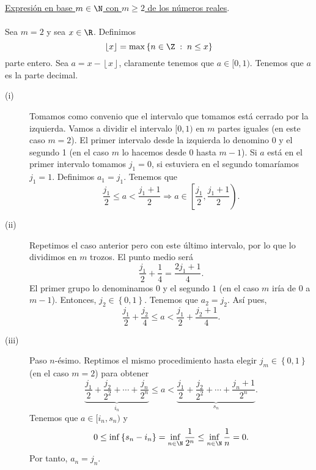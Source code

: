 \underline{Expresión en base $\displaystyle m \in \N $ con $\displaystyle m \geq 2 $ de los números reales}. \\ \\
\normalfont Sea $\displaystyle m = 2 $ y sea $\displaystyle x \in \R $. Definimos 
\[\left\lfloor x \right\rfloor = \max \left\{ n \in \Z \; : \; n\leq x\right\}  \]
parte entero. Sea $\displaystyle a = x - \left\lfloor x \right\rfloor $, claramente tenemos que $\displaystyle a \in [0,1) $. Tenemos que $\displaystyle a $ es la parte decimal.  
\begin{description}
\item[(i)] Tomamos como convenio que el intervalo que tomamos está cerrado por la izquierda. Vamos a dividir el intervalo $\displaystyle [0,1) $ en $\displaystyle m $ partes iguales (en este caso $\displaystyle m = 2 $). El primer intervalo desde la izquierda lo denomino 0 y el segundo 1 (en el caso $\displaystyle m $ lo hacemos desde 0 hasta $\displaystyle m -1 $). Si $\displaystyle a $ está en el primer intervalo tomamos $\displaystyle j_{1} = 0 $, si estuviera en el segundo tomaríamos $\displaystyle j_{1} = 1 $. Definimos $\displaystyle a_{1} = j_{1} $. Tenemos que 
	\[\frac{j_{1}}{2}\leq a < \frac{j_{1}+1}{2} \Rightarrow a \in \left[\frac{j_{1}}{2}, \frac{j_{1}+1}{2}\right).\]
\item[(ii)] Repetimos el caso anterior pero con este último intervalo, por lo que lo dividimos en $\displaystyle m $ trozos. El punto medio será
	\[\frac{j_{1}}{2} + \frac{1}{4} = \frac{2j_{1}+1}{4} .\]
	El primer grupo lo denominamos $\displaystyle 0 $ y el segundo $\displaystyle 1 $ (en el caso $\displaystyle m $ iría de $\displaystyle 0 $ a $\displaystyle m -1 $). Entonces, $\displaystyle j_{2}\in \left\{ 0,1\right\}  $. Tenemos que $\displaystyle a_{2}=j_{2} $. Así pues, 
	\[\frac{j_{1}}{2}+\frac{j_{2}}{4} \leq a < \frac{j_{1}}{2} + \frac{j_{2}+1}{4} .\]
\item[(iii)] Paso $\displaystyle n $-ésimo. Reptimos el mismo procedimiento hasta elegir $\displaystyle j_{m}\in \left\{ 0,1\right\}  $ (en el caso $\displaystyle m=2 $) para obtener
	\[\underbrace{\frac{j_{1}}{2}+\frac{j_{2}}{2^{2}} + \cdots + \frac{j_{n}}{2^{n}}}_{i_{n}}\leq a < \underbrace{\frac{j_{1}}{2} + \frac{j_{2}}{2^{2}}+ \cdots +\frac{j_{n}+1}{2^{n}}}_{s_{n}} .\]
	Tenemos que $\displaystyle a \in [i_{n}, s_{n}) $ y 
\[0 \leq \displaystyle \inf \left\{ s_{n}- i_{n}\right\} = \inf_{n \in \N} \frac{1}{2^{n}} \leq \inf_{n\in\N} \frac{1}{n} = 0 .\]
Por tanto, $\displaystyle a_{n}= j_{n} $.
\end{description}

